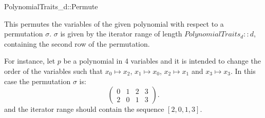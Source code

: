 \begin{ccRefConcept}{PolynomialTraits_d::Permute}

\ccDefinition

This  permutes the variables of the given polynomial
with respect to a permutation $\sigma$. $\sigma$ is given by the iterator 
range of length $PolynomialTraits_d::d$, containing the second row of the permutation. 

For instance, let $p$ be a polynomial in 4 variables and it is intended to 
change the order of the variables such that 
$x_0 \mapsto x_2$, 
$x_1 \mapsto x_0$, 
$x_2 \mapsto x_1$ and 
$x_3 \mapsto x_3$. In this case 
the permutation $\sigma$ is: 
\[\left( \begin{array}{ccccc} 0&1&2&3\\ 2&0&1&3 \end{array}\right).\]
and the iterator range should contain the sequence $[2,0,1,3]$. 


\ccRefines 


\ccTypes

\ccGlue

\ccOperations


\ccOperations
{}






\ccSeeAlso

\\
\\

\end{ccRefConcept}